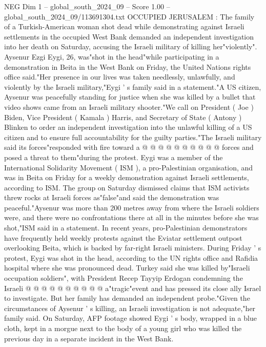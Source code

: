\begin{textsample}{NEG Dim 1 – global\_south\_2024\_09 – Score 1.00 – global\_south\_2024\_09/113691304.txt}  \label{ex:f1_neg_418}
OCCUPIED JERUSALEM : The family of a Turkish-American woman shot dead while demonstrating against Israeli settlements in the occupied West Bank demanded an independent investigation into her death on Saturday, accusing the Israeli military of killing her"violently".
Aysenur Ezgi Eygi, 26, was"shot in the head"while participating in a demonstration in Beita in the West Bank on Friday, the United Nations rights office said."Her presence in our lives was taken needlessly, unlawfully, and violently by the Israeli military,"Eygi ' s family said in a statement."A US citizen, Aysenur was peacefully standing for justice when she was killed by a bullet that video shows came from an Israeli military shooter."We call on President ( Joe ) Biden, Vice President ( Kamala ) Harris, and Secretary of State ( Antony ) Blinken to order an independent investigation into the unlawful killing of a US citizen and to ensure full accountability for the guilty parties."The Israeli military said its forces"responded with fire toward a @ @ @ @ @ @ @ @ @ @ forces and posed a threat to them"during the protest.
Eygi was a member of the International Solidarity Movement ( ISM ), a pro-Palestinian organisation, and was in Beita on Friday for a weekly demonstration against Israeli settlements, according to ISM.
The group on Saturday dismissed claims that ISM activists threw rocks at Israeli forces as"false"and said the demonstration was peaceful."Aysenur was more than 200 metres away from where the Israeli soldiers were, and there were no confrontations there at all in the minutes before she was shot,"ISM said in a statement.
In recent years, pro-Palestinian demonstrators have frequently held weekly protests against the Eviatar settlement outpost overlooking Beita, which is backed by far-right Israeli ministers.
During Friday ' s protest, Eygi was shot in the head, according to the UN rights office and Rafidia hospital where she was pronounced dead.
Turkey said she was killed by"Israeli occupation soldiers", with President Recep Tayyip Erdogan condemning the Israeli @ @ @ @ @ @ @ @ @ @ a"tragic"event and has pressed its close ally Israel to investigate.
But her family has demanded an independent probe."Given the circumstances of Aysenur ' s killing, an Israeli investigation is not adequate,"her family said.
On Saturday, AFP footage showed Eygi ' s body, wrapped in a blue cloth, kept in a morgue next to the body of a young girl who was killed the previous day in a separate incident in the West Bank.

\end{textsample}
